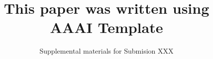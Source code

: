 
% 

\renewcommand{\thesection}{S\arabic{section}}
\renewcommand{\thetable}{S\arabic{table}}
\renewcommand{\thefigure}{S\arabic{figure}}

\pagestyle{empty}

\author{Supplemental materials for Submision XXX}
\title{This paper was written using AAAI Template}

\maketitle



\fontsize{9.5pt}{10.5pt}
\selectfont




